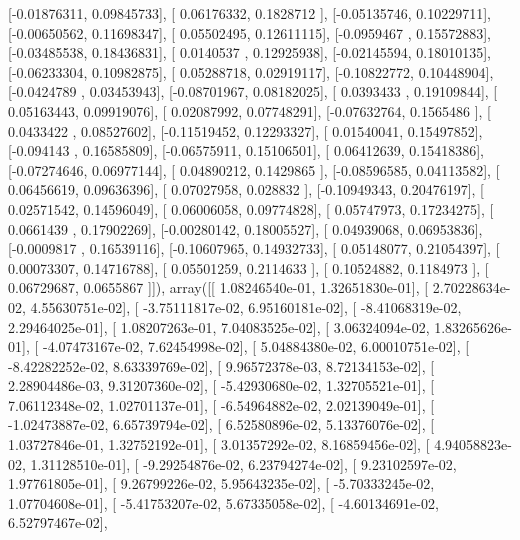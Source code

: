 \documentclass{article}
\begin{document}
       [-0.01876311,  0.09845733],
       [ 0.06176332,  0.1828712 ],
       [-0.05135746,  0.10229711],
       [-0.00650562,  0.11698347],
       [ 0.05502495,  0.12611115],
       [-0.0959467 ,  0.15572883],
       [-0.03485538,  0.18436831],
       [ 0.0140537 ,  0.12925938],
       [-0.02145594,  0.18010135],
       [-0.06233304,  0.10982875],
       [ 0.05288718,  0.02919117],
       [-0.10822772,  0.10448904],
       [-0.0424789 ,  0.03453943],
       [-0.08701967,  0.08182025],
       [ 0.0393433 ,  0.19109844],
       [ 0.05163443,  0.09919076],
       [ 0.02087992,  0.07748291],
       [-0.07632764,  0.1565486 ],
       [ 0.0433422 ,  0.08527602],
       [-0.11519452,  0.12293327],
       [ 0.01540041,  0.15497852],
       [-0.094143  ,  0.16585809],
       [-0.06575911,  0.15106501],
       [ 0.06412639,  0.15418386],
       [-0.07274646,  0.06977144],
       [ 0.04890212,  0.1429865 ],
       [-0.08596585,  0.04113582],
       [ 0.06456619,  0.09636396],
       [ 0.07027958,  0.028832  ],
       [-0.10949343,  0.20476197],
       [ 0.02571542,  0.14596049],
       [ 0.06006058,  0.09774828],
       [ 0.05747973,  0.17234275],
       [ 0.0661439 ,  0.17902269],
       [-0.00280142,  0.18005527],
       [ 0.04939068,  0.06953836],
       [-0.0009817 ,  0.16539116],
       [-0.10607965,  0.14932733],
       [ 0.05148077,  0.21054397],
       [ 0.00073307,  0.14716788],
       [ 0.05501259,  0.2114633 ],
       [ 0.10524882,  0.1184973 ],
       [ 0.06729687,  0.0655867 ]]), array([[  1.08246540e-01,   1.32651830e-01],
       [  2.70228634e-02,   4.55630751e-02],
       [ -3.75111817e-02,   6.95160181e-02],
       [ -8.41068319e-02,   2.29464025e-01],
       [  1.08207263e-01,   7.04083525e-02],
       [  3.06324094e-02,   1.83265626e-01],
       [ -4.07473167e-02,   7.62454998e-02],
       [  5.04884380e-02,   6.00010751e-02],
       [ -8.42282252e-02,   8.63339769e-02],
       [  9.96572378e-03,   8.72134153e-02],
       [  2.28904486e-03,   9.31207360e-02],
       [ -5.42930680e-02,   1.32705521e-01],
       [  7.06112348e-02,   1.02701137e-01],
       [ -6.54964882e-02,   2.02139049e-01],
       [ -1.02473887e-02,   6.65739794e-02],
       [  6.52580896e-02,   5.13376076e-02],
       [  1.03727846e-01,   1.32752192e-01],
       [  3.01357292e-02,   8.16859456e-02],
       [  4.94058823e-02,   1.31128510e-01],
       [ -9.29254876e-02,   6.23794274e-02],
       [  9.23102597e-02,   1.97761805e-01],
       [  9.26799226e-02,   5.95643235e-02],
       [ -5.70333245e-02,   1.07704608e-01],
       [ -5.41753207e-02,   5.67335058e-02],
       [ -4.60134691e-02,   6.52797467e-02],
\end{document}
